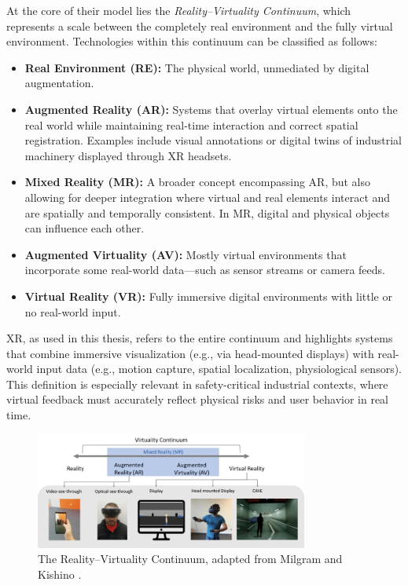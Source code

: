 At the core of their model lies the \textit{Reality–Virtuality Continuum}, which represents a scale between the completely real environment and the fully virtual environment. Technologies within this continuum can be classified as follows:

\begin{itemize}
    \item \textbf{Real Environment (RE):} The physical world, unmediated by digital augmentation.
    
    \item \textbf{Augmented Reality (AR):} Systems that overlay virtual elements onto the real world while maintaining real-time interaction and correct spatial registration. Examples include visual annotations or digital twins of industrial machinery displayed through XR headsets.
    
    \item \textbf{Mixed Reality (MR):} A broader concept encompassing AR, but also allowing for deeper integration where virtual and real elements interact and are spatially and temporally consistent. In MR, digital and physical objects can influence each other.
    
    \item \textbf{Augmented Virtuality (AV):} Mostly virtual environments that incorporate some real-world data—such as sensor streams or camera feeds.
    
    \item \textbf{Virtual Reality (VR):} Fully immersive digital environments with little or no real-world input.
\end{itemize}

XR, as used in this thesis, refers to the entire continuum and highlights systems that combine immersive visualization (e.g., via head-mounted displays) with real-world input data (e.g., motion capture, spatial localization, physiological sensors). This definition is especially relevant in safety-critical industrial contexts, where virtual feedback must accurately reflect physical risks and user behavior in real time.

\begin{figure}[ht]
    \centering
    \includegraphics[width=0.8\textwidth]{Graphics/Continuum.png}
    \caption{The Reality–Virtuality Continuum, adapted from Milgram and Kishino \cite{milgram1994taxonomy}.}
    \label{fig:reality_virtuality_continuum}
\end{figure}

